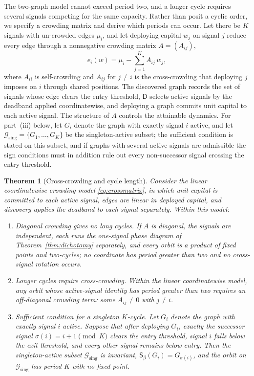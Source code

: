 \documentclass[11pt]{article}
\theoremstyle{plain}
\newtheorem{theorem}{Theorem}
\theoremstyle{definition}
\newcommand{\Gcal}{\mathcal{G}}
\newcommand{\Dop}{\mathsf{D}}
\newcommand{\Sbeta}{\mathsf{S}_\beta}
\begin{document}
The two-graph model cannot exceed period two, and a longer cycle requires several signals competing for the same capacity. Rather than posit a cyclic order, we specify a crowding matrix and derive which periods can occur. Let there be $K$ signals with un-crowded edges $\mu_i$, and let deploying capital $w_j$ on signal $j$ reduce every edge through a nonnegative crowding matrix $A=(A_{ij})$,
\begin{equation}\label{eq:crossmatrix}
e_i(w)=\mu_i-\sum_{j=1}^{K}A_{ij}\,w_j,
\end{equation}
where $A_{ii}$ is self-crowding and $A_{ij}$ for $j\neq i$ is the cross-crowding that deploying $j$ imposes on $i$ through shared positions. The discovered graph records the set of signals whose edge clears the entry threshold, $\Dop$ selects active signals by the deadband applied coordinatewise, and deploying a graph commits unit capital to each active signal. The structure of $A$ controls the attainable dynamics. For part~(iii) below, let $G_i$ denote the graph with exactly signal $i$ active, and let $\Gcal_{\mathrm{sing}}=\{G_1,\dots,G_K\}$ be the singleton-active subset; the sufficient condition is stated on this subset, and if graphs with several active signals are admissible the sign conditions must in addition rule out every non-successor signal crossing the entry threshold.

\begin{theorem}[Cross-crowding and cycle length]\label{thm:multisignal}
Consider the linear coordinatewise crowding model \eqref{eq:crossmatrix}, in which unit capital is committed to each active signal, edges are linear in deployed capital, and discovery applies the deadband to each signal separately. Within this model:
\begin{enumerate}
\item[(i)] \emph{Diagonal crowding gives no long cycles.} If $A$ is diagonal, the signals are independent, each runs the one-signal phase diagram of Theorem~\ref{thm:dichotomy} separately, and every orbit is a product of fixed points and two-cycles; no coordinate has period greater than two and no cross-signal rotation occurs.
\item[(ii)] \emph{Longer cycles require cross-crowding.} Within the linear coordinatewise model, any orbit whose active-signal identity has period greater than two requires an off-diagonal crowding term: some $A_{ij}\neq0$ with $j\neq i$.
\item[(iii)] \emph{Sufficient condition for a singleton $K$-cycle.} Let $G_i$ denote the graph with exactly signal $i$ active. Suppose that after deploying $G_i$, exactly the successor signal $\sigma(i)=i+1\pmod K$ clears the entry threshold, signal $i$ falls below the exit threshold, and every other signal remains below entry. Then the singleton-active subset $\Gcal_{\mathrm{sing}}$ is invariant, $\Sbeta(G_i)=G_{\sigma(i)}$, and the orbit on $\Gcal_{\mathrm{sing}}$ has period $K$ with no fixed point.
\end{enumerate}
\end{theorem}
\end{document}

